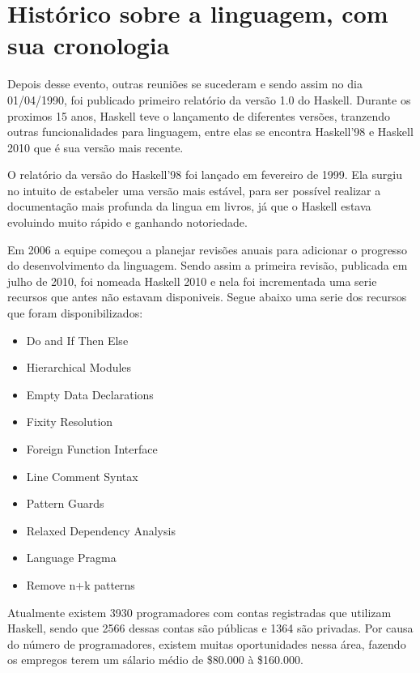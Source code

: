 \chapter{Histórico sobre a linguagem, com sua cronologia}

    Depois desse evento, outras reuniões se sucederam e sendo assim no dia 01/04/1990, foi publicado primeiro relatório
    da versão 1.0 do Haskell. Durante os proximos 15 anos, Haskell teve o lançamento de diferentes versões, tranzendo outras
    funcionalidades para linguagem, entre elas se encontra Haskell'98 e Haskell 2010 que é sua versão mais recente.  

    O relatório da versão do Haskell'98 foi lançado em fevereiro de 1999. Ela surgiu no intuito de estabeler uma versão mais estável, 
    para ser possível realizar a documentação mais profunda da lingua em livros, já que o Haskell estava evoluindo muito rápido e ganhando 
    notoriedade.

    Em 2006 a equipe começou a planejar revisões anuais para adicionar o progresso do desenvolvimento da linguagem. Sendo assim a primeira revisão,
    publicada em julho de 2010, foi nomeada Haskell 2010 e nela foi incrementada uma serie recursos que antes não estavam disponiveis.
    Segue abaixo uma serie dos recursos que foram disponibilizados:
    
    \begin{itemize}
      \item Do and If Then Else 
      \item Hierarchical Modules
      \item Empty Data Declarations
      \item Fixity Resolution 
      \item Foreign Function Interface
      \item Line Comment Syntax
      \item Pattern Guards
      \item Relaxed Dependency Analysis
      \item Language Pragma
      \item Remove n+k patterns
    \end{itemize}

    Atualmente existem 3930 programadores com contas registradas que utilizam Haskell, sendo que 2566
    dessas contas são públicas e 1364 são privadas. Por causa do número de programadores, existem muitas 
    oportunidades nessa área, fazendo os empregos terem um sálario médio de \$80.000 à \$160.000.

